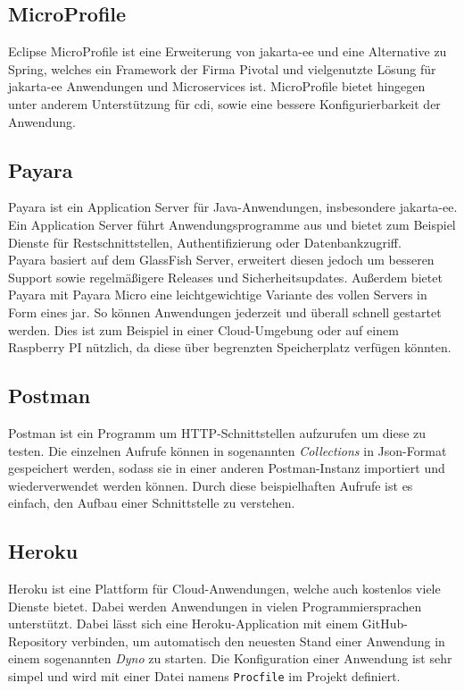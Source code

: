\documentclass[12pt,twoside,a4paper]{article}
\begin{document}
\begin{sloppypar}
\subsection{MicroProfile}\label{sec:microprofile}
Eclipse MicroProfile ist eine Erweiterung von \acrshort{jakarta-ee} und eine Alternative zu Spring, welches ein Framework der Firma Pivotal und vielgenutzte Lösung für \acrshort{jakarta-ee} Anwendungen und Microservices ist.\newline
MicroProfile bietet hingegen unter anderem Unterstützung für \acrfull{cdi}, sowie eine bessere Konfigurierbarkeit der Anwendung.\newline\cite{microprofile}
\subsection{Payara}
Payara ist ein Application Server für Java-Anwendungen, insbesondere \acrshort{jakarta-ee}. Ein Application Server führt Anwendungsprogramme aus und bietet zum Beispiel Dienste für Restschnittstellen, Authentifizierung oder Datenbankzugriff.\\
\cite{app-server}\newline
Payara basiert auf dem GlassFish Server, erweitert diesen jedoch um besseren Support sowie regelmäßigere Releases und Sicherheitsupdates. Außerdem bietet Payara mit Payara Micro eine leichtgewichtige Variante des vollen Servers in Form eines \acrlong{jar}. So können Anwendungen jederzeit und überall schnell gestartet werden. Dies ist zum Beispiel in einer Cloud-Umgebung oder auf einem Raspberry PI nützlich, da diese über begrenzten Speicherplatz verfügen könnten.\\
\cite{payara-vs-glassfish}
\subsection{Postman}\label{sec:postman}
Postman ist ein Programm um HTTP-Schnittstellen aufzurufen um diese zu testen. Die einzelnen Aufrufe können in sogenannten \textit{Collections} in Json-Format gespeichert werden, sodass sie in einer anderen Postman-Instanz importiert und wiederverwendet werden können. Durch diese beispielhaften Aufrufe ist es einfach, den Aufbau einer Schnittstelle zu verstehen.
\subsection{Heroku}\label{sec:heroku}
Heroku ist eine Plattform für Cloud-Anwendungen, welche auch kostenlos viele Dienste bietet. Dabei werden Anwendungen in vielen Programmiersprachen unterstützt. Dabei lässt sich eine Heroku-Application mit einem GitHub-Repository verbinden, um automatisch den neuesten Stand einer Anwendung in einem sogenannten \textit{Dyno} zu starten. Die Konfiguration einer Anwendung ist sehr simpel und wird mit einer Datei namens \texttt{Procfile} im Projekt definiert.\\
\cite{heroku}

\end{sloppypar}
\end{document}
